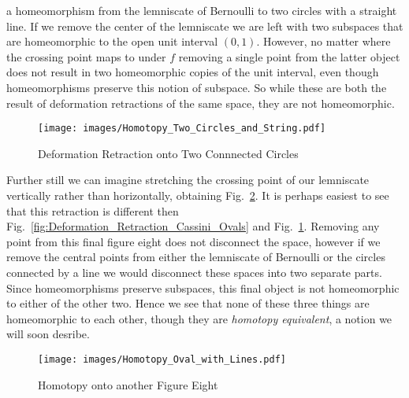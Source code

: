 \documentclass{book}                                                           %
\begin{document}
                a homeomorphism from the lemniscate of Bernoulli to two circles
                with a straight line. If we remove the center of the lemniscate
                we are left with two subspaces that are homeomorphic to the open
                unit interval $(0,1)$. However, no matter where the crossing
                point maps to under $f$ removing a single point from the latter
                object does not result in two homeomorphic copies of the unit
                interval, even though homeomorphisms preserve this notion of
                subspace. So while these are both the result of deformation
                retractions of the same space, they are not homeomorphic.
                \begin{figure}
                    \centering
                    \captionsetup{type=figure}
                    \texttt{[image: images/Homotopy\_Two\_Circles\_and\_String.pdf]}
                    \caption{Deformation Retraction onto Two Connnected Circles}
                    \label{fig:Homotopy_Two_Circles_and_String}
                \end{figure}
                \par\hfill\par
                Further still we can imagine stretching the
                crossing point of our lemniscate vertically rather than
                horizontally, obtaining Fig.~\ref{fig:Homotopy_Oval_with_Line}.
                It is perhaps easiest to see that this retraction is different
                then Fig.~\ref{fig:Deformation_Retraction_Cassini_Ovals} and
                Fig.~\ref{fig:Homotopy_Two_Circles_and_String}. Removing
                any point from this final figure eight does not disconnect the
                space, however if we remove the central points from either the
                lemniscate of Bernoulli or the circles connected by a line we
                would disconnect these spaces into two separate parts. Since
                homeomorphisms preserve subspaces, this final object is not
                homeomorphic to either of the other two. Hence we see that none
                of these three things are homeomorphic to each other, though
                they are \textit{homotopy equivalent}, a notion we will soon
                desribe.
                \begin{figure}[H]
                    \centering
                    \captionsetup{type=figure}
                    \texttt{[image: images/Homotopy\_Oval\_with\_Lines.pdf]}
                    \caption{Homotopy onto another Figure Eight}
                    \label{fig:Homotopy_Oval_with_Line}
                \end{figure}
\end{document}

